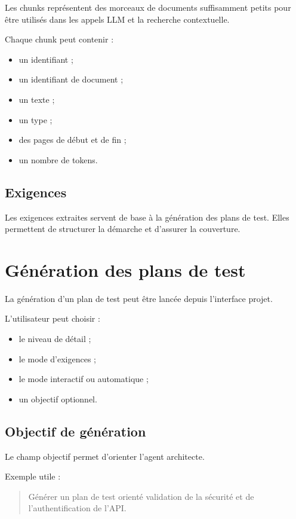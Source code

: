 \documentclass[
  french,
]{report}
\providecommand{\tightlist}{%
  \setlength{\itemsep}{0pt}\setlength{\parskip}{0pt}}
\begin{document}
Les chunks représentent des morceaux de documents suffisamment petits
pour être utilisés dans les appels LLM et la recherche contextuelle.

Chaque chunk peut contenir :

\begin{itemize}
\tightlist
\item
  un identifiant ;
\item
  un identifiant de document ;
\item
  un texte ;
\item
  un type ;
\item
  des pages de début et de fin ;
\item
  un nombre de tokens.
\end{itemize}

\section{Exigences}\label{exigences}

Les exigences extraites servent de base à la génération des plans de
test. Elles permettent de structurer la démarche et d'assurer la
couverture.

\chapter{Génération des plans de
test}\label{guxe9nuxe9ration-des-plans-de-test}

La génération d'un plan de test peut être lancée depuis l'interface
projet.

L'utilisateur peut choisir :

\begin{itemize}
\tightlist
\item
  le niveau de détail ;
\item
  le mode d'exigences ;
\item
  le mode interactif ou automatique ;
\item
  un objectif optionnel.
\end{itemize}

\section{Objectif de génération}\label{objectif-de-guxe9nuxe9ration}

Le champ objectif permet d'orienter l'agent architecte.

Exemple utile :

\begin{quote}
Générer un plan de test orienté validation de la sécurité et de
l'authentification de l'API.
\end{quote}
\end{document}
